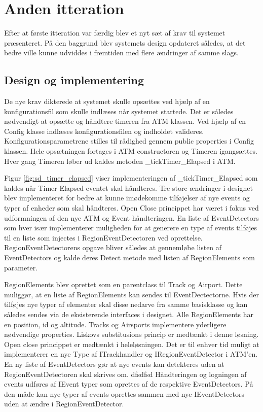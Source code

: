 \thispagestyle{fancy}
\chapter{Anden itteration}
\label{chp:seconditteration}
Efter at første itteration var færdig blev et nyt sæt af krav til systemet præsenteret. På den baggrund blev systemets design opdateret således, at det bedre ville kunne udviddes i fremtiden med flere ændringer af samme slags. 

\section{Design og implementering}
De nye krav dikterede at systemet skulle opsættes ved hjælp af en konfigurationsfil som skulle indlæses når systemet startede. Det er således nødvendigt at opsætte og håndtere timeren fra ATM klassen. Ved hjælp af en Config klasse indlæses konfigurationsfilen og indholdet valideres. Konfigurationsparametrene stilles til rådighed gennem public properties i Config klassen. Hele opsætningen fortages i ATM constructoren og Timeren igangsættes. Hver gang Timeren løber ud kaldes metoden \_tickTimer\_Elapsed i ATM. 


Figur \ref{fig:sd_timer_elapsed} viser implementeringen af \_tickTimer\_Elapsed som kaldes når Timer Elapsed eventet skal håndteres. Tre store ændringer i designet blev implementeret for bedre at kunne imødekomme tilføjelser af nye events og typer af enheder som skal håndteres. Open Close princippet har været i fokus ved udformningen af den nye ATM og Event håndteringen.
En liste af EventDetectors som hver især implementerer muligheden for at generere en type af events tilføjes til en liste som injectes i RegionEventDetectoren ved oprettelse. RegionEventDetectorens opgave bliver således at gennemløbe listen af EventDetectors og kalde deres Detect metode med listen af RegionElements som parameter.

RegionElements blev oprettet som en parentclass til Track og Airport. Dette muliggør, at en liste af RegionElements kan sendes til EventDectectorne. Hvis der tilføjes nye typer af elementer skal disse nedarve fra samme basisklasse og kan således sendes via de eksisterende interfaces i designet. Alle RegionElements har en position, id og altitude. Tracks og Airsports implementere yderligere nødvendige properties. Liskovs substitusions princip er medtænkt i denne løsning.
Open close princippet er medtænkt i heleløsningen. Det er til enhver tid muligt at implementerer en nye Type af ITrackhandler og IRegionEventDetector i ATM'en. En ny liste af EventDetectors gør at nye events kan detekteres uden at RegionEventDetectoren skal skrives om. 
dfsdfsd 
Håndteringen og logningen af events udføres af IEvent typer som oprettes af de respektive EventDetectors. På den måde kan nye typer af events oprettes sammen med nye IEventDetectors uden at ændre i RegionEventDetector.

